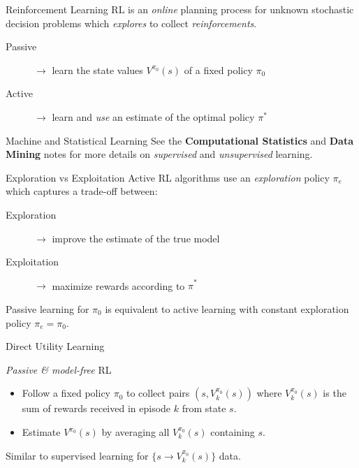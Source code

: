 \documentclass{cognito}
\begin{document}
\begin{note}{Reinforcement Learning}
	RL is an \emph{online} planning process for unknown stochastic decision problems which \emph{explores} to collect \emph{reinforcements}.
	\begin{description}
		\item[Passive] $\to$ learn the state values $V^{\pi_0}(s)$ of a fixed policy $\pi_0$
		\item[Active] $\to$ learn and \emph{use} an estimate of the optimal policy $\pi^*$
	\end{description}
	\vspace{-5pt}
\end{note}

\begin{note}{Machine and Statistical Learning}
	See the \textbf{Computational Statistics} \noteref and \textbf{Data Mining} \noteref notes
	for more details on \emph{supervised} and \emph{unsupervised} learning.
	
\end{note}


\begin{note}{Exploration vs Exploitation}
	Active RL algorithms use an \emph{exploration} policy $\pi_e$ which captures a trade-off between:
	\begin{description}
		\item[Exploration] $\to$ improve the estimate of the true model
		\item[Exploitation] $\to$ maximize rewards according to $\hat{\pi}^*$
	\end{description}
	\begin{remark}
		Passive learning for $\pi_0$ is equivalent to active learning with constant exploration policy $\pi_e = \pi_0$.
	\end{remark}
	\vspace{-5pt}
\end{note}

\begin{note}{Direct Utility Learning}
	\begin{mdframed}[linecolor=black!25!white]
		\emph{Passive \& model-free} RL
	\end{mdframed}
	\begin{itemize}
		\item Follow a fixed policy $\pi_0$ to collect pairs $(s, V^{\pi_0}_k(s))$ where $V^{\pi_0}_k(s)$ is the sum of rewards
		received in episode $k$ from state $s$.
		\item Estimate $V^{\pi_0}(s)$ by averaging all $V^{\pi_0}_k(s)$ containing $s$.
	\end{itemize}
	\begin{remark} Similar to supervised learning for $\{ s \to  V^{\pi_0}_k(s) \}$ data.\end{remark}
	\vspace{-5pt}
\end{note}
\end{document}
